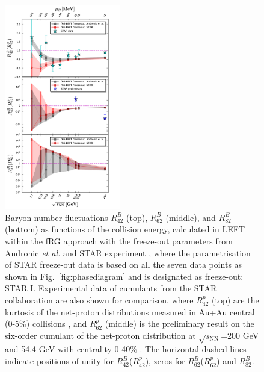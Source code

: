 \documentclass[%
reprint,
superscriptaddress,
showpacs,preprintnumbers,
amsmath,amssymb,
aps,
prd,
]{revtex4-1}
\def\Fig#1{Fig.~\ref{#1}} \def\Tab#1{Tab.~\ref{#1}}
\begin{document}
%	
\begin{figure}[t]
\includegraphics[width=0.45\textwidth]{Rm2-sqrtS}
\caption{Baryon number fluctuations $R^{B}_{42}$ (top), $R^{B}_{62}$ (middle), and $R^{B}_{82}$ (bottom) as functions of the collision energy, calculated in LEFT within the fRG approach with the freeze-out parameters from Andronic {\it et al.} \cite{Andronic:2017pug} and STAR experiment \cite{Adamczyk:2017iwn}, where the parametrisation of STAR freeze-out data is based on all the seven data points as shown in \Fig{fig:phasediagram} and is designated as freeze-out: STAR I. Experimental data of cumulants from the STAR collaboration are also shown for comparison, where $R^{p}_{42}$ (top) are the kurtosis of the net-proton distributions measured in Au+Au central (0-5\%) collisions \cite{Adam:2020unf}, and $R^{p}_{62}$ (middle) is the preliminary result on the six-order cumulant of the net-proton distribution at $\sqrt{s_{\mathrm{NN}}}$=200 GeV and 54.4 GeV with centrality 0-40\% \cite{Nonaka:2020crv,Pandav:2020uzx}. The horizontal dashed lines indicate positions of unity for $R^{B}_{42}$($R^{p}_{42}$), zeros for $R^{B}_{62}$($R^{p}_{62}$) and $R^{B}_{82}$.}\label{fig:Rm2-sqrtS}\vspace{-0.5cm}
\end{figure}
%
	
\end{document}
